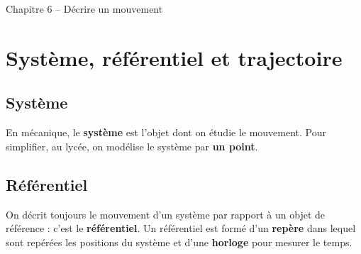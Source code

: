 \documentclass[12pt,a4paper]{article}
\begin{document}
\vspace*{-2.5\baselineskip}

\begin{header}
Chapitre 6 -- Décrire un mouvement
\end{header}

\section{Système, référentiel et trajectoire}

\subsection{Système}

En mécanique, le \textbf{système} est l'objet dont on étudie le mouvement.
Pour simplifier, au lycée, on modélise le système par \textbf{un point}.

\subsection{Référentiel}
\label{sec:referentiel}

On décrit toujours le mouvement d'un système par rapport à un objet de référence : c'est le \textbf{référentiel}.
Un référentiel est formé d'un \textbf{repère} dans lequel sont repérées les positions du système et d'une \textbf{horloge} pour mesurer le temps. 
\end{document}
